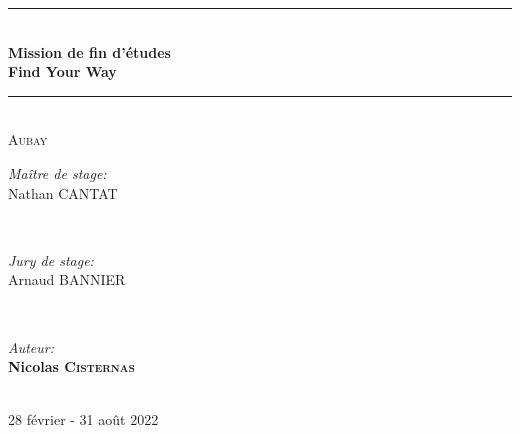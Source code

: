 \documentclass[11pt]{article}
\newcommand{\HRule}{\rule{\linewidth}{0.5mm}}
\begin{document}
\begin{titlepage}

    \HRule \\[0.4cm]
  
    { \huge \bfseries Mission de fin d’études}\\ 
    \vspace{5ex}
    { \huge \bfseries Find Your Way}
    
    \HRule \\[0.8cm]
    \textsc{\LARGE Aubay}\\[1.5cm]
    

    \begin{minipage}{0.4\textwidth}
      \begin{flushleft} \large
        \emph{Maître de stage:} \\
        Nathan  \textsc{CANTAT} 
      \end{flushleft}
    \end{minipage}
    ~
    \begin{minipage}{0.4\textwidth}
      \begin{flushright} \large
        \emph{Jury de stage:} \\
        Arnaud  \textsc{BANNIER} 
      \end{flushright}
    \end{minipage}\\[2cm]
    
    \begin{minipage}{0.4\textwidth}    
      \emph{Auteur:}\\
      \bfseries \Large Nicolas \textsc{Cisternas}      
    \end{minipage}\\[2cm]


    \large 28 février - 31 août 2022

  \end{titlepage}
\end{document}
